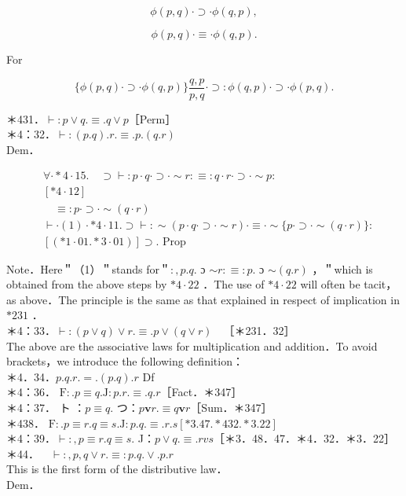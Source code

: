 \documentclass[10pt]{article}
\begin{document}
$$
\phi(p, q) \cdot \supset \cdot \phi(q, p),
$$

$$
\phi(p, q) \cdot \equiv \cdot \phi(q, p) .
$$

For

$$
\{\phi(p, q) \cdot \supset \cdot \phi(q, p)\} \frac{q, p}{p, q} \cdot \supset: \phi(q, p) \cdot \supset \cdot \phi(p, q) .
$$

＊431．$\vdash: p \vee q . \equiv . q \vee p$［Perm］\\
＊4：32．$\vdash:(p . q) . r . \equiv . p .(q . r)$\\
Dem．


\begin{align*}
& \forall \cdot * 4 \cdot 15 . \quad \supset \vdash: p \cdot q \cdot \supset \cdot \sim r: \equiv: q \cdot r \cdot \supset \cdot \sim p: \\
& {[* 4 \cdot 12]}  \tag{1}\\
& \quad \equiv: p \cdot \supset \cdot \sim(q \cdot r) \\
& \vdash \cdot(1) \cdot * 4 \cdot 11 . \supset \vdash: \sim(p \cdot q \cdot \supset \cdot \sim r) \cdot \equiv \cdot \sim\{p \cdot \supset \cdot \sim(q \cdot r)\}: \\
& {[(* 1 \cdot 01 . * 3 \cdot 01)] \supset \text {. Prop }}
\end{align*}


Note．Here＂（1）＂stands for＂$:, p . q$. ɔ $\sim r: \equiv: p$. ɔ $\sim(q . r)$ ，＂which is obtained from the above steps by $* 4 \cdot 22$ ．The use of $* 4 \cdot 22$ will often be tacit，as above．The principle is the same as that explained in respect of implication in $* 231$ ．\\
＊4：33．$\vdash:(p \vee q) \vee r . \equiv . p \vee(q \vee r) \quad$［＊231．32］\\
The above are the associative laws for multiplication and addition．To avoid brackets，we introduce the following definition：\\
＊4．34．$p . q . r .=.(p . q) . r$ Df\\
＊4：36． $\mathrm{F}: . p \equiv q . \mathrm{J}: p . r . \equiv . q . r$［Fact．＊347］\\
＊4：37． ト ：$p \equiv q$. つ：$p \mathbf{v} r . \equiv q \mathbf{v} r$［Sum．＊347］\\
＊438． $\mathrm{F}: . p \equiv r . q \equiv s . \mathrm{J}: p . q . \equiv . r . s[* 3.47 . * 432 . * 3.22]$\\
＊4：39．$\vdash:, p \equiv r . q \equiv s$. J：$p \vee q . \equiv . r v s$［＊3．48．47．＊4．32．＊3．22］\\
＊44．$\quad \vdash:, p, q \vee r . \equiv: p . q . \vee . p . r$\\
This is the first form of the distributive law．\\
Dem．
\end{document}
